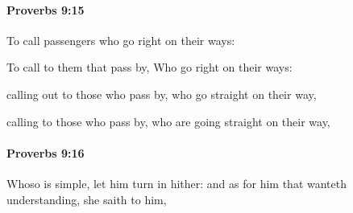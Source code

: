 		\paragraph{Proverbs 9:15} %
			\label{PROVERBS-9-15}

			To call passengers who go right on their ways:

			\begin{versebox}
					\item[BHS] 
					\item[ASV] To call to them that pass by, Who go right on their ways:
					\item[NIV] calling out to those who pass by, who go straight on their way,
					\item[NRSV] calling to those who pass by, who are going straight on their way,
			\end{versebox}

		\paragraph{Proverbs 9:16} %
			\label{PROVERBS-9-16}

			Whoso is simple, let him turn in hither: and as for him that wanteth understanding, she saith to him,

